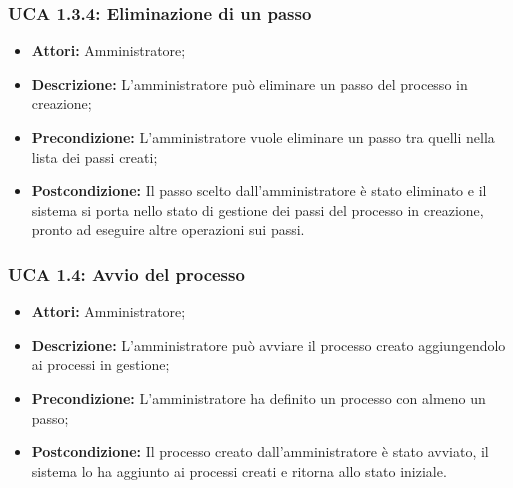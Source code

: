 \hypertarget{A1.3.4}{}
\subsubsection{UCA 1.3.4: Eliminazione di un passo}
\begin{itemize}
\item \textbf{Attori:}
 Amministratore;
\item \textbf{Descrizione:} 
L'amministratore può eliminare un passo del processo in creazione; 
\item \textbf{Precondizione:}
 L'amministratore vuole eliminare un passo tra quelli nella lista dei passi creati;
\item \textbf{Postcondizione:} 
Il passo scelto dall'amministratore è stato eliminato e il sistema si porta nello stato di gestione dei passi del processo in creazione, pronto ad eseguire altre operazioni sui passi. 
\end{itemize}

\hypertarget{A1.4}{}
\subsubsection{UCA 1.4: Avvio del processo}
\begin{itemize}
\item \textbf{Attori:}
 Amministratore;
\item \textbf{Descrizione:} 
L'amministratore può avviare il processo creato aggiungendolo ai processi in gestione; 
\item \textbf{Precondizione:} 
L'amministratore ha definito un processo con almeno un passo;
\item \textbf{Postcondizione:} 
Il processo creato dall'amministratore è stato avviato, il sistema lo ha aggiunto ai processi creati e ritorna allo stato iniziale.
\end{itemize}

\hypertarget{A2}{}
